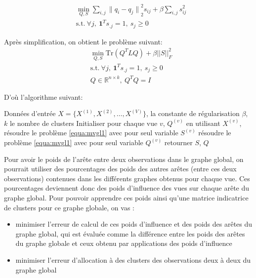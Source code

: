\documentclass[12pt, french, latin.medieval, a4paper]{report}
\begin{document}
	\begin{equation*}
   	 \begin{aligned}
   		 & \min_{Q,S} \sum_{i,j} {\|q_i-q_j\|}_2^2s_{ij} +  \beta \sum_{i,j} s_{ij}^2
        	\\ & \text{s.t.}\ \forall j,\ \textbf{1}^Ts_{.j} = 1,\ s_j\geq0
    	\end{aligned}
    \end{equation*}
    
	Après simplification, on obtient le problème suivant:
	\begin{equation}
   	 \begin{aligned}
   		 & \min_{Q,S} \text{Tr}(Q^TLQ) + \beta{||S||}_F^2
        	\\ & \text{s.t.}\ \forall j,\ \textbf{1}^Ts_{.j} = 1,\ s_j\geq0
        	\\ & Q \in \mathbb{R}^{n \times k} ,\ Q^TQ = I
    	\end{aligned}
   	 \label{equa:mvgl1}
    \end{equation}

    D'où l'algorithme suivant:
    \begin{algorithm}[H]
    	\caption{Algorithme d'apprentissage des graphes de chaque vue \cite{zhan2017graph}}
    	\label{alg:mvgl1}
    	\begin{algorithmic}[1]
    	\REQUIRE Données d'entrée $X = \{ X^{(1)}, X^{(2)},\dots,X^{(V)} \}$, la constante de régularisation $\beta$, $k$ le nombre de clusters
    	\STATE Initialiser pour chaque vue $v$, $Q^{(v)}$ en utilisant $X^{(v)}$,
        	\REPEAT
   			 \STATE résoudre le problème \ref{equa:mvgl1} avec pour seul variable $S^{(v)}$
            	\STATE résoudre le problème \ref{equa:mvgl1} avec pour seul variable $Q^{(v)}$
   	 \ENDFOR
    	\STATE retourner $S$, $Q$
    	\end{algorithmic}
	\end{algorithm}
    
	Pour avoir le poids de l'arête entre deux observations dans le graphe global, on pourrait utiliser des pourcentages des poids des autres arêtes (entre ces deux observations) contenues dans les différents graphes obtenus pour chaque vue.
	Ces pourcentages deviennent donc des poids d'influence des vues sur chaque arête du graphe global.
	Pour pouvoir apprendre ces poids ainsi qu'une matrice indicatrice de clusters pour ce graphe globale, on vas :
	\begin{itemize}
    	\item minimiser l'erreur de calcul de ces poids d'influence et des poids des arêtes du graphe global, qui est évaluée comme la différence entre les poids des arêtes du graphe globale et ceux obtenu par applications des poids d'influence
    	\item minimiser l'erreur d'allocation à des clusters des observations deux à deux du graphe global
	\end{itemize}
    
\end{document}

